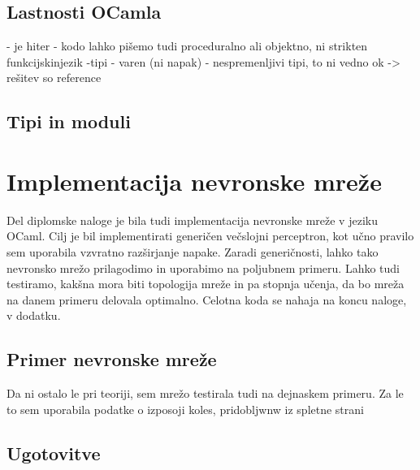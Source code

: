 \documentclass[mat1]{fmfdelo}
\begin{document}



\subsection{Lastnosti OCamla}

- je hiter
- kodo lahko pišemo tudi proceduralno ali objektno, ni strikten funkcijskinjezik
-tipi
- varen (ni napak)
- nespremenljivi tipi, to ni vedno ok -> rešitev so reference

\subsection{Tipi in moduli}


\section{Implementacija nevronske mreže}
Del diplomske naloge je bila tudi implementacija nevronske mreže v jeziku OCaml. Cilj je bil implementirati generičen večslojni perceptron, kot učno pravilo sem uporabila vzvratno razširjanje napake. Zaradi generičnosti, lahko tako nevronsko mrežo prilagodimo in uporabimo na poljubnem primeru. Lahko tudi testiramo, kakšna mora biti topologija mreže in pa stopnja učenja, da bo mreža na danem primeru delovala optimalno. Celotna koda se nahaja na koncu naloge, v dodatku.

\subsection{Primer nevronske mreže}
Da ni ostalo le pri teoriji, sem mrežo testirala tudi na dejnaskem primeru. Za le to sem uporabila podatke o izposoji koles, pridobljwnw iz spletne strani %

\subsection{Ugotovitve}
\end{document}
